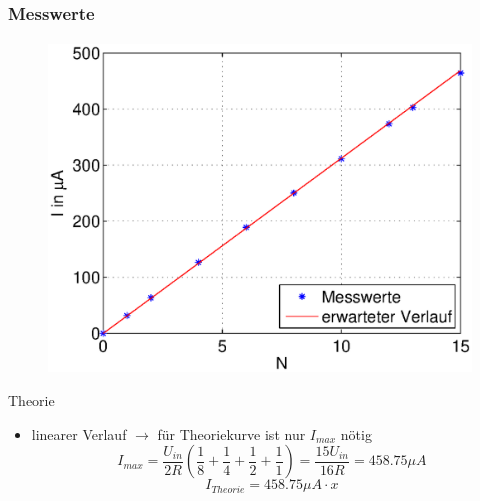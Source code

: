 \begin{frame}
    \frametitle{Messwerte}
    \framesubtitle{}
    \begin{figure}[H]
    \begin{center}
            \includegraphics[scale=0.37]{./img/graph/Aufgabe1a.eps}
    \end{center}
    \end{figure}
    \begin{block}{Theorie}
         \begin{itemize}
            \item linearer Verlauf $\rightarrow$ für Theoriekurve ist
            nur $I_{max}$ nötig
            \begin{equation*}
                I_{max} = \frac{U_{in}}{2R}\left( \frac{1}{8} +
                \frac{1}{4} + \frac{1}{2} + \frac{1}{1} \right) 
                = \frac{15U_{in}}{16R}
                = 458.75 \mu A
            \end{equation*}
            \begin{equation*}
                I_{Theorie} = 458.75 \mu A \cdot x
            \end{equation*}
         \end{itemize}
    \end{block}
\end{frame}

